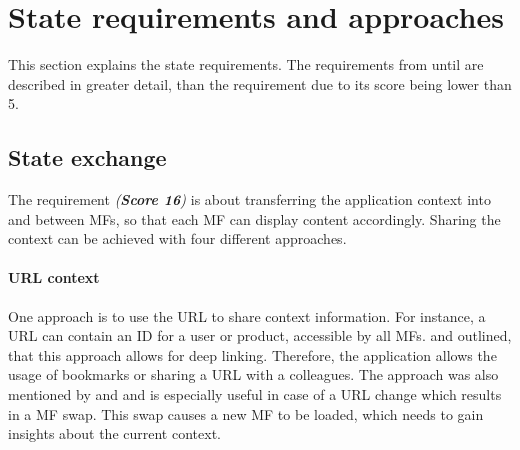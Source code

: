 
\section{State requirements and approaches}\label{cha:requirement_detail_state}

This section explains the state requirements.
The requirements from \textit{} until \textit{} are described in greater detail, than the requirement \textit{} due to its score being lower than 5.





\subsection{State exchange}\label{cha:requirement_detail_state_exchange}

The requirement \textit{ (\textbf{Score 16})} is about transferring the application context into and between \acp{MF}, so that each \ac{MF} can display content accordingly.
Sharing the context can be achieved with four different approaches.



\paragraph{\ac{URL} context}

One approach is to use the \ac{URL} to share context information.
For instance, a \ac{URL} can contain an \ac{ID} for a user or product, accessible by all \acp{MF}.
\textciteSteyer{} and \textcite{Grijzen.2019} outlined, that this approach allows for deep linking\footnotemark.
Therefore, the application allows the usage of bookmarks or sharing a \ac{URL} with a colleagues.
The approach was also mentioned by \textciteRehm{} and \textcite{Jackson.2019} and is especially useful in case of a \ac{URL} change which results in a \ac{MF} swap.
This swap causes a new \ac{MF} to be loaded, which needs to gain insights about the current context.

